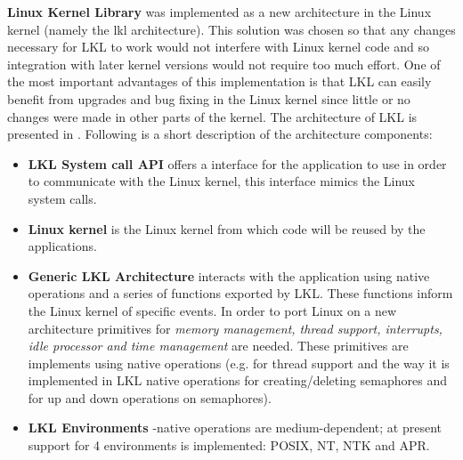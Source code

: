 \textbf{Linux Kernel Library} was implemented as a new architecture in the Linux kernel (namely the lkl architecture). 
This solution was chosen so that any changes necessary for LKL to work would not interfere with Linux kernel code and 
so integration with later kernel versions would not require too much effort. One of the most important advantages of 
this implementation is that LKL can easily benefit from upgrades and bug fixing in the Linux kernel since little or 
no changes were made in other parts of the kernel. 
The architecture of LKL is presented in .
Following is a short description of the architecture components:
\begin{itemize}
\item \textbf{LKL System call API} offers a interface for the application to use in order to communicate with the Linux kernel, 
this interface mimics the Linux system calls.
\item \textbf{Linux kernel} is the Linux kernel from which code will be reused by the applications. 
\item \textbf{Generic LKL Architecture} interacts with the application using native operations and a series of functions exported by LKL. 
These functions inform the Linux kernel of specific events. In order to port Linux on a new architecture primitives for 
\textit{memory management, thread support, interrupts, idle processor and time management} are needed. These primitives are 
implements using native operations (e.g. for thread support and the way it is implemented in LKL native operations for 
creating/deleting semaphores and for up and down operations on semaphores). 
\item \textbf{LKL Environments} -native operations are medium-dependent; at present support for 4 environments is implemented:  POSIX, NT, NTK and APR. 
\end{itemize}
\begin{comment}
\begin{itemize}
\item \textit{Memory management mechanism} LKL has implemented a native function for memory allocation.
\item \textit{Thread support} LKL needs an implementation for kernel threads for which purpose native operation for working with threads are required. These operations will be converted by the \textbf{lkl architecture} in order to work with the Linux kernel. Native operations for creating/deleting semaphores and for up and down operations.
\item \textit{Interrupts}
\item \textit{Idle processor}
\item \textit{Time management} 
\end{itemize} 
\end{comment}
